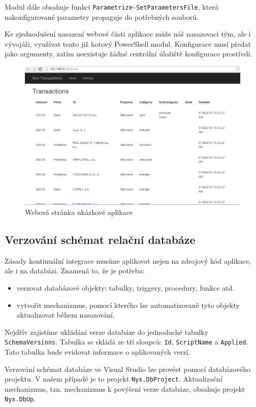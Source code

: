 Modul dále obsahuje funkci \texttt{Parametrize-SetParametersFile}, která nakonfigurované parametry propaguje do potřebných souborů.

Ke zjednodušení nasazení webové části aplikace může náš nasazovací tým, ale i vývojáři, využívat tento již hotový PowerShell modul. Konfigurace  musí předat jako argumenty, zatím neexistuje žádné centrální úložiště konfigurace prostředí.

\begin{figure}[]
  \centering
  \includegraphics[width=15cm]{fig/web.jpg}
  \caption{Webová stránka ukázkové aplikace}
  \label{fig:web}
\end{figure}

\subsection{Verzování schémat relační databáze}
Zásady kontinuální integrace musíme aplikovat nejen na zdrojový kód aplikace, ale i na databázi. Znamená to, že je potřeba: 

\begin{itemize}
\item verzovat databázové objekty: tabulky, triggery, procedury, funkce atd.
\item vytvořit mechanizmus, pomocí kterého lze automatizovaně tyto objekty aktualizovat během nasazování. 
\end{itemize}

Nejdřív zajistíme ukládání verze databáze do jednoduché tabulky \texttt{SchemaVersions}. Tabulka se skládá ze tří sloupců: \texttt{Id}, \texttt{ScriptName} a \texttt{Applied}. Tato tabulka bude evidovat informace o aplikovaných verzí.

Verzování schémat databáze ve Visual Studio lze provést pomocí databázového projektu. V našem případě je to projekt \texttt{Nyx.DbProject}. Aktualizační mechanizmus, tzn. mechanizmus k povýšení verze databáze, obsahuje projekt \texttt{Nyx.DbUp}. 

